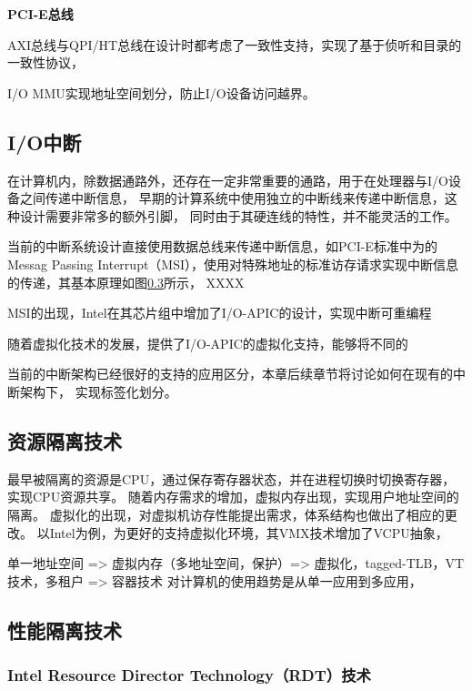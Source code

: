 \textbf{PCI-E总线}

AXI总线与QPI/HT总线在设计时都考虑了一致性支持，实现了基于侦听和目录的一致性协议，

I/O MMU实现地址空间划分，防止I/O设备访问越界。


\subsection{I/O中断}
在计算机内，除数据通路外，还存在一定非常重要的通路，用于在处理器与I/O设备之间传递中断信息，
早期的计算系统中使用独立的中断线来传递中断信息，这种设计需要非常多的额外引脚，
同时由于其硬连线的特性，并不能灵活的工作。

当前的中断系统设计直接使用数据总线来传递中断信息，如PCI-E标准中为的Messag Passing Interrupt（MSI），使用对特殊地址的标准访存请求实现中断信息的传递，其基本原理如图\ref{}所示，
XXXX

MSI的出现，Intel在其芯片组中增加了I/O-APIC的设计，实现中断可重编程

随着虚拟化技术的发展，提供了I/O-APIC的虚拟化支持，能够将不同的

当前的中断架构已经很好的支持的应用区分，本章后续章节将讨论如何在现有的中断架构下，
实现标签化划分。


\subsection{资源隔离技术}

最早被隔离的资源是CPU，通过保存寄存器状态，并在进程切换时切换寄存器，实现CPU资源共享。
随着内存需求的增加，虚拟内存出现，实现用户地址空间的隔离。
虚拟化的出现，对虚拟机访存性能提出需求，体系结构也做出了相应的更改。
以Intel为例，为更好的支持虚拟化环境，其VMX技术增加了VCPU抽象，

单一地址空间 => 虚拟内存（多地址空间，保护）=> 虚拟化，tagged-TLB，VT技术，多租户
                                            => 容器技术
对计算机的使用趋势是从单一应用到多应用，

\subsection{性能隔离技术}

\subsubsection*{Intel Resource Director Technology（RDT）技术}

